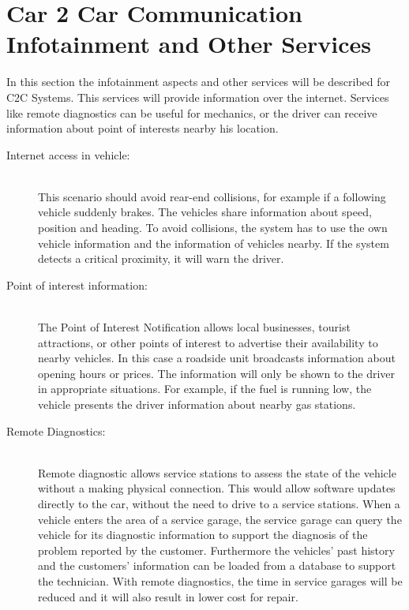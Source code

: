 \section{Car 2 Car Communication Infotainment and Other Services}
\label{sec:C2COtherServices}
In this section the infotainment aspects and other services will be described for C2C Systems. This services will provide information over the internet. Services like remote diagnostics can be useful for mechanics, or the driver can receive information about point of interests nearby his location.\\
\begin{description}
  \item[Internet access in vehicle:] \hfill \\ This scenario should avoid rear-end collisions, for example if a following vehicle suddenly brakes. The vehicles share information about speed, position and heading. To avoid collisions, the system has to use the own vehicle information and the information of vehicles nearby. If the system detects a critical proximity, it will warn the driver.\cite{c2cmanifesto}
  \item[Point of interest information:] \hfill \\ The Point of Interest Notification allows local businesses, tourist attractions, or other points of interest to advertise their availability to nearby vehicles. In this case a roadside unit broadcasts information about opening hours or prices. The information will only be shown to the driver in appropriate situations. For example, if the fuel is running low, the vehicle presents the driver information about nearby gas stations.\cite{c2cmanifesto}
  \item[Remote Diagnostics:] \hfill \\ Remote diagnostic allows service stations to assess the state of the vehicle without a making physical connection. This would allow software updates directly to the car, without the need to drive to a service stations. When a vehicle enters the area of a service garage, the 
service garage can query the vehicle for its diagnostic information to support the diagnosis of the problem reported by the customer. Furthermore the vehicles' past history and the customers' information can be loaded from a database to support the technician. With remote diagnostics, the time in service garages will be reduced and it will also result in lower cost for repair.\cite{c2cmanifesto}

\end{description}	